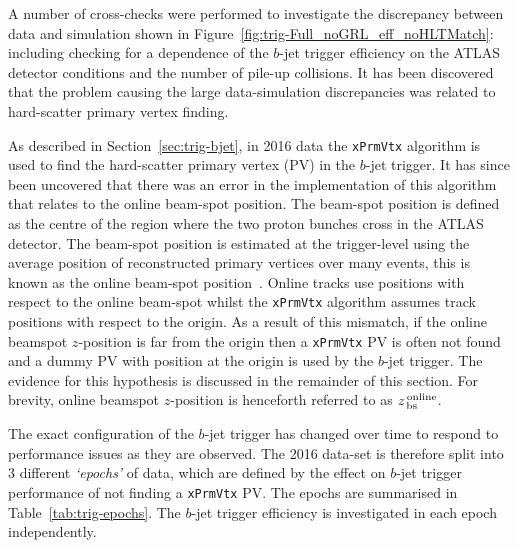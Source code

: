 
A number of cross-checks were performed to investigate the discrepancy between data and simulation shown in Figure~\ref{fig:trig-Full_noGRL_eff_noHLTMatch}:
including checking for a dependence of the $b$-jet trigger efficiency on the ATLAS detector conditions and the number of pile-up collisions.
It has been discovered that the problem causing the large data-simulation discrepancies was related to hard-scatter primary vertex finding.

As described in Section~\ref{sec:trig-bjet}, in 2016 data the \verb|xPrmVtx| algorithm is used to find the hard-scatter primary vertex (PV) in the $b$-jet trigger.
It has since been uncovered that there was an error in the implementation of this algorithm that relates to the online beam-spot position.
The beam-spot position is defined as the centre of the region where the two proton bunches cross in the ATLAS detector.
The beam-spot position is estimated at the trigger-level using the average position of reconstructed primary vertices over many events,
this is known as the online beam-spot position~\cite{trig-onlinePV}.
Online tracks use positions with respect to the online beam-spot
whilst the \verb|xPrmVtx| algorithm assumes track positions with respect to the origin.
As a result of this mismatch, if the online beamspot $z$-position is far from the origin then
a \verb|xPrmVtx| PV is often not found and a dummy PV with position at the origin is used by the $b$-jet trigger.
The evidence for this hypothesis is discussed in the remainder of this section.
For brevity, online beamspot $z$-position is henceforth referred to as $z_{\,\text{bs}}^{\text{\,online}}$.  

The exact configuration of the $b$-jet trigger has changed over time to respond to performance issues as they are observed.
The 2016 data-set is therefore split into 3 different \textit{`epochs'} of data, which are defined by the effect on $b$-jet trigger performance of not finding a \verb|xPrmVtx| PV.
The epochs are summarised in Table~\ref{tab:trig-epochs}.
The $b$-jet trigger efficiency is investigated in each epoch independently.


